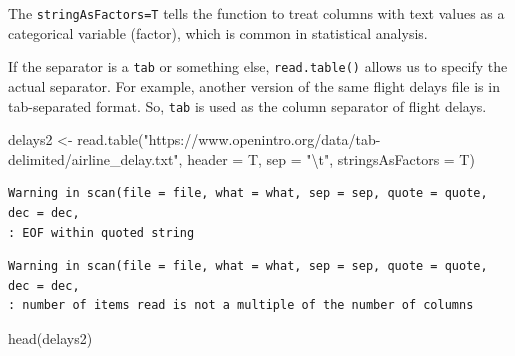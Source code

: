 \documentclass[
  letterpaper,
  DIV=11,
  numbers=noendperiod]{scrreprt}
\newenvironment{Shaded}{\begin{snugshade}}{\end{snugshade}}
\newcommand{\AttributeTok}[1]{\textcolor[rgb]{0.40,0.45,0.13}{#1}}
\newcommand{\FunctionTok}[1]{\textcolor[rgb]{0.28,0.35,0.67}{#1}}
\newcommand{\NormalTok}[1]{\textcolor[rgb]{0.00,0.23,0.31}{#1}}
\newcommand{\OtherTok}[1]{\textcolor[rgb]{0.00,0.23,0.31}{#1}}
\newcommand{\SpecialCharTok}[1]{\textcolor[rgb]{0.37,0.37,0.37}{#1}}
\newcommand{\StringTok}[1]{\textcolor[rgb]{0.13,0.47,0.30}{#1}}
\begin{document}
The \texttt{stringAsFactors=T} tells the function to treat columns with
text values as a categorical variable (factor), which is common in
statistical analysis.

If the separator is a \texttt{tab} or something else,
\texttt{read.table()} allows us to specify the actual separator. For
example, another version of the same flight delays file is in
tab-separated format. So, \texttt{tab} is used as the column separator
of flight delays.

\begin{Shaded}
\begin{Highlighting}[]
\NormalTok{delays2 }\OtherTok{\textless{}{-}} \FunctionTok{read.table}\NormalTok{(}\StringTok{"https://www.openintro.org/data/tab{-}delimited/airline\_delay.txt"}\NormalTok{,}
                      \AttributeTok{header =}\NormalTok{ T,}
                      \AttributeTok{sep =} \StringTok{"}\SpecialCharTok{\textbackslash{}t}\StringTok{"}\NormalTok{,}
                      \AttributeTok{stringsAsFactors =}\NormalTok{ T)}
\end{Highlighting}
\end{Shaded}

\begin{verbatim}
Warning in scan(file = file, what = what, sep = sep, quote = quote, dec = dec,
: EOF within quoted string
\end{verbatim}

\begin{verbatim}
Warning in scan(file = file, what = what, sep = sep, quote = quote, dec = dec,
: number of items read is not a multiple of the number of columns
\end{verbatim}

\begin{Shaded}
\begin{Highlighting}[]
\FunctionTok{head}\NormalTok{(delays2)}
\end{Highlighting}
\end{Shaded}
\end{document}
